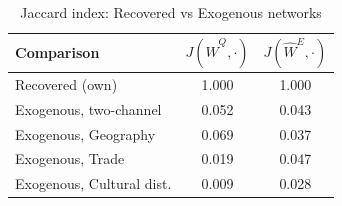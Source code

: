 \begin{table}

\caption{\label{tab:tab:jaccard}Jaccard index: Recovered vs Exogenous networks}
\centering
\begin{tabular}[t]{lcc}
\toprule
Comparison & $J(\hat W^Q, \cdot)$ & $J(\hat W^E, \cdot)$\\
\midrule
Recovered (own) & 1.000 & 1.000\\
Exogenous, two-channel & 0.052 & 0.043\\
Exogenous, Geography & 0.069 & 0.037\\
Exogenous, Trade & 0.019 & 0.047\\
Exogenous, Cultural dist. & 0.009 & 0.028\\
\bottomrule
\end{tabular}
\end{table}
